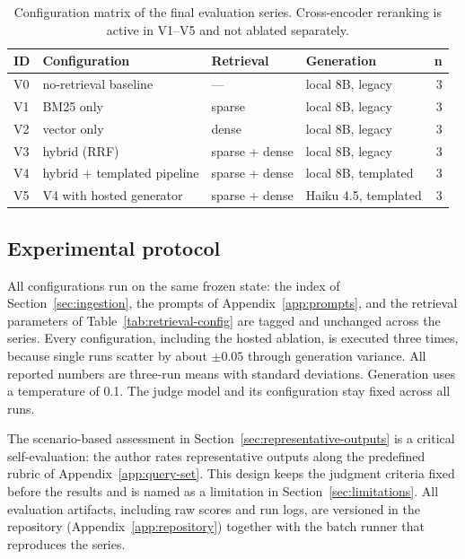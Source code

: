 \begin{table}[H]
    \centering
    \small
    \begin{tabular}{llllr}
        \toprule
        \textbf{ID} & \textbf{Configuration} & \textbf{Retrieval} & \textbf{Generation} & \textbf{n} \\
        \midrule
        V0 & no-retrieval baseline & --- & local 8B, legacy & 3 \\
        V1 & BM25 only & sparse & local 8B, legacy & 3 \\
        V2 & vector only & dense & local 8B, legacy & 3 \\
        V3 & hybrid (RRF) & sparse + dense & local 8B, legacy & 3 \\
        V4 & hybrid + templated pipeline & sparse + dense & local 8B, templated & 3 \\
        V5 & V4 with hosted generator & sparse + dense & Haiku 4.5, templated & 3 \\
        \bottomrule
    \end{tabular}
    \caption{Configuration matrix of the final evaluation series.
             Cross-encoder reranking is active in V1--V5 and not ablated
             separately.}
    \label{tab:configurations}
\end{table}

\subsection{Experimental protocol}
\label{sec:protocol}

All configurations run on the same frozen state: the index of
Section~\ref{sec:ingestion}, the prompts of
Appendix~\ref{app:prompts}, and the retrieval parameters of
Table~\ref{tab:retrieval-config} are tagged and unchanged across the
series. Every configuration, including the hosted ablation, is executed three
times, because single runs scatter by about $\pm 0.05$ through
generation variance. All reported numbers are three-run means with
standard deviations. Generation uses a temperature of 0.1. The
judge model and its configuration stay fixed across all runs.

The scenario-based assessment in
Section~\ref{sec:representative-outputs} is a critical self-evaluation:
the author rates representative outputs along the predefined rubric of
Appendix~\ref{app:query-set}. This design keeps the judgment criteria
fixed before the results and is named as a limitation in
Section~\ref{sec:limitations}. All evaluation artifacts, including raw
scores and run logs, are versioned in the repository
(Appendix~\ref{app:repository}) together with the batch runner that
reproduces the series.
